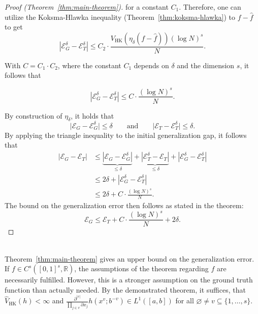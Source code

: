 \begin{proof}[Proof (Theorem~\ref{thm:main-theorem})]
    for a constant $C_1$. Therefore, one can utilize the Koksma-Hlawka inequality
    (Theorem~\ref{thm:koksma-hlawka}) to $f-\hat{f}$ to get
    \begin{equation}
        \label{eq:hk_generalization_gap}
        |\mathcal{E}_G^\delta - \mathcal{E}_T^\delta| \leq C_2 \cdot \frac{V_{\mathrm{HK}}(\eta_\delta(f-\hat{f}))(\log N)^s}{N}.
    \end{equation}

    With $C=C_1 \cdot C_2$, where the constant $C_1$ depends on $\delta$ and the dimension $s$, it follows that

    \begin{equation}
        |\mathcal{E}_G^\delta - \mathcal{E}_T^\delta | \leq C \cdot \frac{(\log N)^s}{N}.
    \end{equation}

    By construction of $\eta_\delta$, it holds that
    \begin{equation}
        \big| \mathcal{E}_G - \mathcal{E}_G^\delta \big|\leq \delta \qquad \text{and} \qquad \big| \mathcal{E}_T - \mathcal{E}_T^\delta \big| \leq \delta.
    \end{equation}
    By applying the triangle inequality to the initial generalization gap, it follows that
    \begin{align*}
        |\mathcal{E}_G - \mathcal{E}_T| &\leq \underbrace{|\mathcal{E}_G - \mathcal{E}_G^\delta|}_{\leq \delta} + \underbrace{|\mathcal{E}_T^\delta - \mathcal{E}_T|}_{\leq \delta} + |\mathcal{E}_G^\delta - \mathcal{E}_T^\delta| \\
        &\leq 2\delta + |\mathcal{E}_G^\delta - \mathcal{E}_T^\delta| \\
        &\leq 2\delta + C \cdot \frac{(\log N)^s}{N}.
    \end{align*}
    The bound on the generalization error then follows as stated in the theorem:
    \begin{equation}
        \mathcal{E}_G \leq \mathcal{E}_T + C \cdot \frac{(\log N)^s}{N} + 2\delta.
    \end{equation}

\end{proof}

\begin{remark} \ \\
    Theorem~\ref{thm:main-theorem} gives an upper bound on the generalization
    error. If $f\in C^s([0,1]^s,\mathbb{R})$, the assumptions of the theorem
    regarding $f$ are necessarily fulfilled. However, this is a stronger
    assumption on the ground truth function than actually needed. By the
    demonstrated theorem, it suffices, that $\widehat{V}_{\mathrm{HK}}(h) <
    \infty$ and $\frac{\partial^{|v|}}{\prod_{j\in v}\partial x_j} h(x^v;b^{-v})
    \in L^1([a,b])$ for all $\varnothing \neq v\subseteq \{1,\dots,s\}$.
\end{remark}

